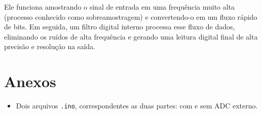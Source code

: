 \documentclass[a4paper,oneside,10pt]{article}
\begin{document}
Ele funciona amostrando o sinal de entrada em uma frequência muito alta (processo conhecido como sobreamostragem) e convertendo-o em um fluxo rápido de bits. Em seguida, um filtro digital interno processa esse fluxo de dados, eliminando os ruídos de alta frequência e gerando uma leitura digital final de alta precisão e resolução na saída.

\section{Anexos}

\begin{itemize}
	\item Dois arquivos \texttt{.ino}, correspondentes as duas partes: com e sem ADC externo.
\end{itemize}

\newpage



\end{document}
